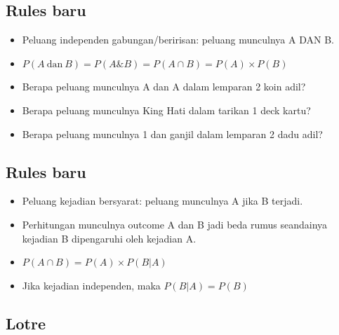 \documentclass[
  letterpaper,
  DIV=11,
  numbers=noendperiod]{scrartcl}
\begin{document}
\subsection{Rules baru}\label{rules-baru}

\begin{itemize}
\item
  Peluang independen gabungan/beririsan: peluang munculnya A DAN B.
\item
  \(P(A \ \text{dan} \ B)=P(A\&B) = P(A \cap B) = P(A) \times P(B)\)
\item
  Berapa peluang munculnya A dan A dalam lemparan 2 koin adil?
\item
  Berapa peluang munculnya King Hati dalam tarikan 1 deck kartu?
\item
  Berapa peluang munculnya 1 dan ganjil dalam lemparan 2 dadu adil?
\end{itemize}

\subsection{Rules baru}\label{rules-baru-1}

\begin{itemize}
\item
  Peluang kejadian bersyarat: peluang munculnya A jika B terjadi.
\item
  Perhitungan munculnya outcome A dan B jadi beda rumus seandainya
  kejadian B dipengaruhi oleh kejadian A.
\item
  \(P(A \cap B)=P(A) \times P(B|A)\)
\item
  Jika kejadian independen, maka \(P(B|A)= P(B)\)
\end{itemize}

\subsection{Lotre}\label{lotre}
\end{document}

